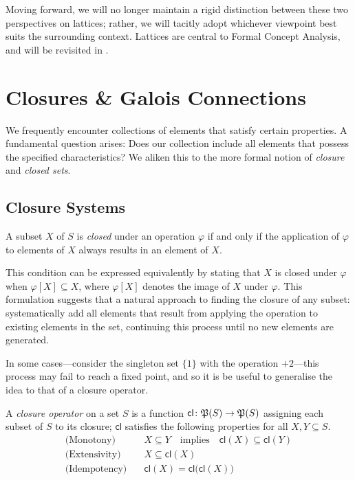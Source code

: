 Moving forward, we will no longer maintain a rigid distinction between these two perspectives on lattices; rather, we will tacitly adopt whichever
viewpoint best suits the surrounding context. Lattices are central to Formal Concept Analysis, and will be revisited in .

\section{Closures \& Galois Connections}
\label{section:closure-systems}

We frequently encounter collections of elements that satisfy certain properties. A fundamental question arises: Does our collection include
all elements that possess the specified characteristics? We aliken this to the more formal notion of \textit{closure} and \textit{closed
sets}.

\subsection{Closure Systems}

\begin{definition}
   \label{definition:closed-set} A subset $X$ of $S$ is \textit{closed} under an operation $\varphi$ if and only if the
  application of $\varphi$ to elements of $X$ always results in an element of $X$.
\end{definition}

This condition can be expressed equivalently by stating that $X$ is closed under $\varphi$ when $\varphi [X] \subseteq X$, where
$\varphi[X]$ denotes the image of $X$ under $\varphi$. This formulation suggests that a natural approach to finding the closure of any subset:
systematically add all elements that result from applying the operation to existing elements in the set, continuing this process until no new
elements are generated.

In some cases---consider the singleton set $\{1\}$ with the operation $+2$---this process may fail to reach a fixed point, and so it is be
useful to generalise the idea to that of a closure operator.

\begin{definition}
   \label{definition:closure-operator} A \emph{closure operator} on a set $S$ is a function
  $\mathsf{cl}\colon \mathfrak{P}({S})\to \mathfrak{P}({S})$ assigning each subset of $S$ to its closure; $\mathsf{cl}$ satisfies the following properties for
  all $X,Y \subseteq S$.
  \begin{align}
    \text{(Monotony)}\quad    & X \subseteq Y\quad \text{implies}\quad\mathsf{cl}(X) \subseteq \mathsf{cl}(Y) \\
    \text{(Extensivity)}\quad & X \subseteq \mathsf{cl}(X)                                                    \\
    \text{(Idempotency)}\quad & \mathsf{cl}(X) = \mathsf{cl}\big(\mathsf{cl}(X)\big)
  \end{align}
\end{definition}

